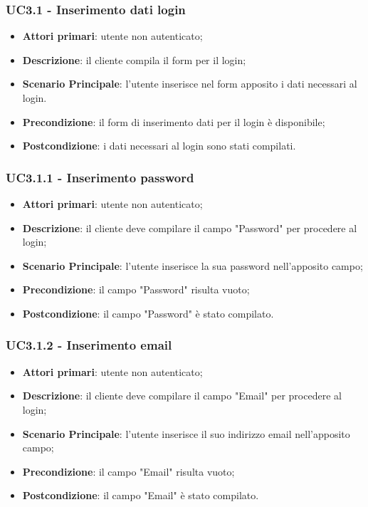 \subsubsection{UC3.1 - Inserimento dati login}
\begin{itemize}
\item \textbf{Attori primari}: utente non autenticato;
\item \textbf{Descrizione}: il cliente compila il form per il login;
\item \textbf{Scenario Principale}: l'utente inserisce nel form apposito i dati necessari al login.
\item \textbf{Precondizione}: il form di inserimento dati per il login è disponibile;
\item \textbf{Postcondizione}: i dati necessari al login sono stati compilati.
\end{itemize}

\subsubsection{UC3.1.1 - Inserimento password}
\begin{itemize}
\item \textbf{Attori primari}: utente non autenticato;
\item \textbf{Descrizione}: il cliente deve compilare il campo "Password" per procedere al login;
\item \textbf{Scenario Principale}: l'utente inserisce la sua password nell'apposito campo;
\item \textbf{Precondizione}: il campo "Password" risulta vuoto;
\item \textbf{Postcondizione}: il campo "Password" è stato compilato.
\end{itemize}

\subsubsection{UC3.1.2 - Inserimento email}
\begin{itemize}
\item \textbf{Attori primari}: utente non autenticato;
\item \textbf{Descrizione}: il cliente deve compilare il campo "Email" per procedere al login;
\item \textbf{Scenario Principale}: l'utente inserisce il suo indirizzo email nell'apposito campo;
\item \textbf{Precondizione}: il campo "Email" risulta vuoto;
\item \textbf{Postcondizione}: il campo "Email" è stato compilato.
\end{itemize}


